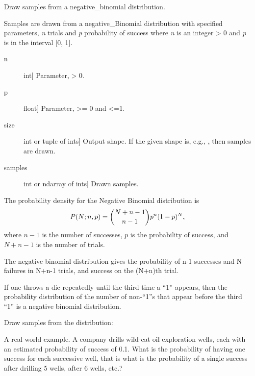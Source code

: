 \documentclass[letterpaper,10pt,english]{sphinxmanual}
\begin{document}
\begin{fulllineitems}
\label{pygeomod:pygeomod.geomodeller_xml_obj.negative_binomial}
Draw samples from a negative\_binomial distribution.

Samples are drawn from a negative\_Binomial distribution with specified
parameters, \emph{n} trials and \emph{p} probability of success where \emph{n} is an
integer \textgreater{} 0 and \emph{p} is in the interval {[}0, 1{]}.
\begin{description}
\item[{n}] \leavevmode{[}int{]}
Parameter, \textgreater{} 0.

\item[{p}] \leavevmode{[}float{]}
Parameter, \textgreater{}= 0 and \textless{}=1.

\item[{size}] \leavevmode{[}int or tuple of ints{]}
Output shape. If the given shape is, e.g., , then
 samples are drawn.

\end{description}
\begin{description}
\item[{samples}] \leavevmode{[}int or ndarray of ints{]}
Drawn samples.

\end{description}

The probability density for the Negative Binomial distribution is
\begin{gather}
\begin{split}P(N;n,p) = \binom{N+n-1}{n-1}p^{n}(1-p)^{N},\end{split}\notag
\end{gather}
where \(n-1\) is the number of successes, \(p\) is the probability
of success, and \(N+n-1\) is the number of trials.

The negative binomial distribution gives the probability of n-1 successes
and N failures in N+n-1 trials, and success on the (N+n)th trial.

If one throws a die repeatedly until the third time a ``1'' appears, then the
probability distribution of the number of non-``1''s that appear before the
third ``1'' is a negative binomial distribution.

Draw samples from the distribution:

A real world example. A company drills wild-cat oil exploration wells, each
with an estimated probability of success of 0.1.  What is the probability
of having one success for each successive well, that is what is the
probability of a single success after drilling 5 wells, after 6 wells,
etc.?


\end{fulllineitems}
\end{document}
